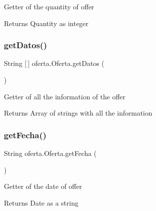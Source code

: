 Getter of the quantity of offer

\begin{DoxyReturn}{Returns}
Quantity as integer 
\end{DoxyReturn}
\mbox{\label{classoferta_1_1_oferta_ab7e97fc4914cdd00e07b36a944170e3b}} 
\subsubsection{\texorpdfstring{get\+Datos()}{getDatos()}}
{\footnotesize\ttfamily String \mbox{[}$\,$\mbox{]} oferta.\+Oferta.\+get\+Datos (\begin{DoxyParamCaption}{ }\end{DoxyParamCaption})\hspace{0.3cm}{\ttfamily [inline]}}

Getter of all the information of the offer

\begin{DoxyReturn}{Returns}
Array of strings with all the information 
\end{DoxyReturn}
\mbox{\label{classoferta_1_1_oferta_a431cf8c490fc904d8c280f597e343b65}} 
\subsubsection{\texorpdfstring{get\+Fecha()}{getFecha()}}
{\footnotesize\ttfamily String oferta.\+Oferta.\+get\+Fecha (\begin{DoxyParamCaption}{ }\end{DoxyParamCaption})\hspace{0.3cm}{\ttfamily [inline]}}

Getter of the date of offer

\begin{DoxyReturn}{Returns}
Date as a string 
\end{DoxyReturn}
\mbox{\label{classoferta_1_1_oferta_a9e5faa568e05867cf20972dd64a02838}} 
